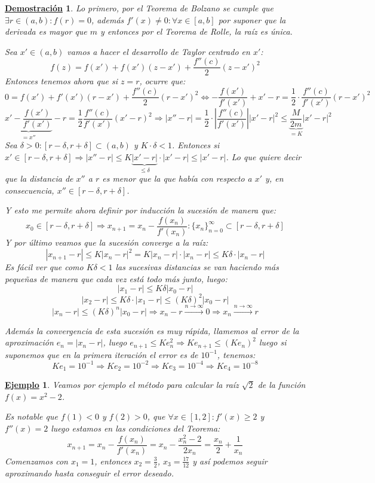 \documentclass[10pt,a4paper,openright]{book}
\theoremstyle{break}
\newtheorem*{demo}{\underline{Demostración}}
\newtheorem{ej}{\underline{Ejemplo}}[chapter]
\begin{document}
\begin{demo}
Lo primero, por el Teorema de Bolzano se cumple que $\exists r\in (a,b): f(r)=0$, además $f'(x)\neq 0: \forall x\in [a,b]$ por suponer que la derivada es mayor que $m$ y entonces por el Teorema de Rolle, la raíz es única.

Sea $x'\in (a,b)$ vamos a hacer el desarrollo de Taylor centrado en $x'$:
$$f(z)=f(x')+f(x')(z-x')+\frac{f''(c)}{2}(z-x')^2$$
Entonces tenemos ahora que si $z=r$, ocurre que: 
$$0=f(x')+f'(x')(r-x')+\frac{f''(c)}{2}(r-x')^2\Leftrightarrow -\frac{f(x')}{f'(x')}+x'-r=\frac{1}{2}\cdot \frac{f''(c)}{f'(x')}(r-x')^2$$
$$\underbrace{x'-\frac{f(x')}{f'(x')}}_{=x''}-r =\frac{1}{2} \frac{f''(c)}{f'(x')}(x'-r)^2\Rightarrow |x''-r|=\frac{1}{2}\cdot \left|\frac{f''(c)}{f'(x')}\right||x'-r|^2\leq \underbrace{\frac{M}{2m}}_{=K}|x'-r|^2$$
Sea $\delta>0: [r-\delta, r+\delta]\subset (a,b)$ y $K\cdot \delta <1$. Entonces si $x'\in [r-\delta, r+\delta]\Rightarrow |x''-r|\leq K\underbrace{|x'-r|}_{\leq \delta}\cdot |x'-r|\leq |x'-r|$. Lo que quiere decir que la distancia de $x''$ a $r$ es menor que la que había con respecto a $x'$ y, en consecuencia, $x''\in [r-\delta, r+\delta]$.

Y esto me permite ahora definir por inducción la sucesión de manera que:
$$x_0\in [r-\delta, r+\delta]\Rightarrow x_{n+1}=x_n-\frac{f(x_n)}{f'(x_n)}: \{x_n\}_{n=0}^\infty \subset [r-\delta, r+\delta]$$
Y por último veamos que la sucesión converge a la raíz:
$$|x_{n+1}-r|\leq K|x_n-r|^2=K|x_n-r|\cdot |x_n-r|\leq K\delta \cdot |x_n-r|$$
Es fácil ver que como $K\delta<1$ las sucesivas distancias se van haciendo más pequeñas de manera que cada vez está todo más junto, luego:
$$|x_1-r|\leq K\delta |x_0-r|$$
$$|x_2-r|\leq K\delta\cdot |x_1-r|\leq (K\delta)^2 |x_0-r|$$
$$|x_n-r|\leq (K\delta)^n |x_0-r|\Rightarrow x_n-r\xrightarrow{n\rightarrow \infty}0\Rightarrow x_n\xrightarrow{n\rightarrow \infty} r$$

Además la convergencia de esta sucesión es muy rápida, llamemos al error de la aproximación $e_n=|x_n-r|$, luego $e_{n+1}\leq Ke_n^2\Rightarrow Ke_{n+1}\leq (Ke_n)^2$ luego si suponemos que en la primera iteración el error es de $10^{-1}$, tenemos:
$$Ke_1=10^{-1}\Rightarrow Ke_2=10^{-2}\Rightarrow Ke_3=10^{-4}\Rightarrow Ke_4=10^{-8}$$
\end{demo}

\begin{ej}
Veamos por ejemplo el método para calcular la raíz $\sqrt{2}$ de la función $f(x)=x^2-2$.

Es notable que $f(1)<0$ y $f(2)>0$, que $\forall x\in [1,2]: f'(x)\geq 2$ y $f''(x)=2$ luego estamos en las condiciones del Teorema:
$$x_{n+1}=x_n-\frac{f(x_n)}{f'(x_n)}=x_n-\frac{x_n^2-2}{2x_n}=\frac{x_n}{2}+\frac{1}{x_n}$$
Comenzamos con $x_1=1$, entonces $x_2=\frac{3}{2}$, $x_3=\frac{17}{12}$ y así podemos seguir aproximando hasta conseguir el error deseado.
\end{ej}
\end{document}
